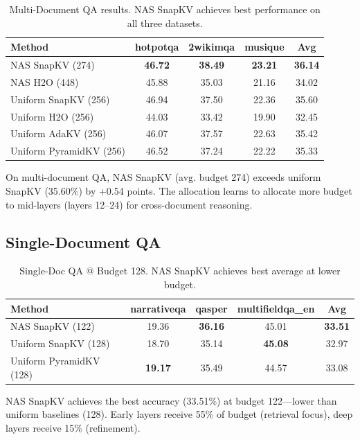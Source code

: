 \documentclass[11pt,a4paper]{article}
\begin{document}
\begin{table}[h]
\centering
\small
\begin{tabular}{l c c c c}
\toprule
\textbf{Method} & \textbf{hotpotqa} & \textbf{2wikimqa} & \textbf{musique} & \textbf{Avg} \\
\midrule
NAS SnapKV (274) & \textbf{46.72} & \textbf{38.49} & \textbf{23.21} & \textbf{36.14} \\
NAS H2O (448) & 45.88 & 35.03 & 21.16 & 34.02 \\
Uniform SnapKV (256) & 46.94 & 37.50 & 22.36 & 35.60 \\
Uniform H2O (256) & 44.03 & 33.42 & 19.90 & 32.45 \\
Uniform AdaKV (256) & 46.07 & 37.57 & 22.63 & 35.42 \\
Uniform PyramidKV (256) & 46.52 & 37.24 & 22.22 & 35.33 \\
\bottomrule
\end{tabular}
\caption{Multi-Document QA results. NAS SnapKV achieves best performance on all three datasets.}
\label{tab:multidoc}
\end{table}

On multi-document QA, NAS SnapKV (avg. budget 274) exceeds uniform SnapKV (35.60\%) by +0.54 points. The allocation learns to allocate more budget to mid-layers (layers 12–24) for cross-document reasoning.

\subsection{Single-Document QA}

\begin{table}[h]
\centering
\small
\begin{tabular}{l c c c c}
\toprule
\textbf{Method} & \textbf{narrativeqa} & \textbf{qasper} & \textbf{multifieldqa\_en} & \textbf{Avg} \\
\midrule
NAS SnapKV (122) & 19.36 & \textbf{36.16} & 45.01 & \textbf{33.51} \\
Uniform SnapKV (128) & 18.70 & 35.14 & \textbf{45.08} & 32.97 \\
Uniform PyramidKV (128) & \textbf{19.17} & 35.49 & 44.57 & 33.08 \\
\bottomrule
\end{tabular}
\caption{Single-Doc QA @ Budget 128. NAS SnapKV achieves best average at lower budget.}
\label{tab:singledoc}
\end{table}

NAS SnapKV achieves the best accuracy (33.51\%) at budget 122—lower than uniform baselines (128). Early layers receive 55\% of budget (retrieval focus), deep layers receive 15\% (refinement).
\end{document}
